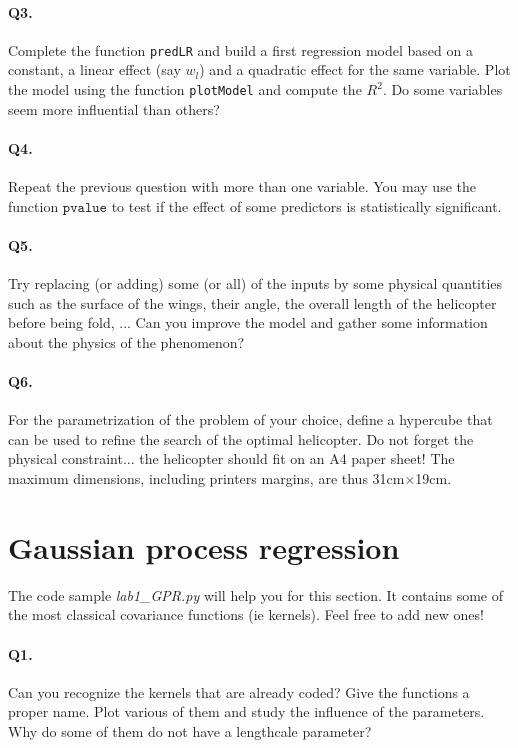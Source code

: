 \documentclass[12pt]{scrartcl}
\begin{document}
\paragraph{Q3.} Complete the function \texttt{predLR} and build a first regression model based on a constant, a linear effect (say $w_l$) and a quadratic effect for the same variable. Plot the model using the function \texttt{plotModel} and compute the $R^2$. Do some variables seem more influential than others?

\paragraph{Q4.} Repeat the previous question with more than one variable. You may use the function $\texttt{pvalue}$ to test if the effect of some predictors is statistically significant.

\paragraph{Q5.} Try replacing (or adding) some (or all) of the inputs by some physical quantities such as the surface of the wings, their angle, the overall length of the helicopter before being fold, ... Can you improve the model and gather some information about the physics of the phenomenon?

\paragraph{Q6.} For the parametrization of the problem of your choice, define a hypercube that can be used to refine the search of the optimal helicopter. Do not forget the physical constraint... the helicopter should fit on an A4 paper sheet! The maximum dimensions, including printers margins, are thus 31cm$\times$19cm.

\section{Gaussian process regression}
The code sample \emph{lab1\_GPR.py} will help you for this section. It contains some of the most classical covariance functions (ie kernels). Feel free to add new ones!

\paragraph{Q1.} Can you recognize the kernels that are already coded? Give the functions a proper name. Plot various of them and study the influence of the parameters. Why do some of them do not have a lengthcale parameter?
\end{document}
